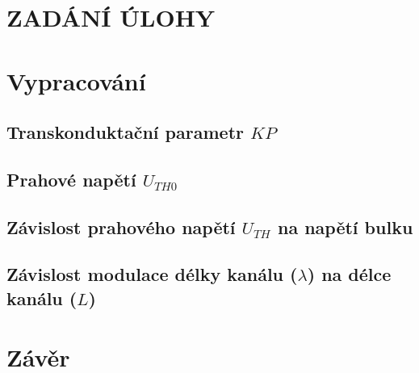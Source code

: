 \documentclass{protokol}
\begin{document}
	\maketitle

\section*{ZADÁNÍ ÚLOHY}
  
\setcounter{section}{0}

  \newpage
\section{Vypracování}
  \subsection{Transkonduktační parametr \(KP\)}  
  
  \newpage
  \subsection{Prahové napětí \(U_{TH0}\)}  
    
  \newpage
  \subsection{Závislost prahového napětí \(U_{TH}\) na napětí bulku}  
    
  \newpage
  \subsection{Závislost modulace délky kanálu (\(\lambda\)) na délce kanálu (\(L\))}
    

\section{Závěr}
  

\end{document}
